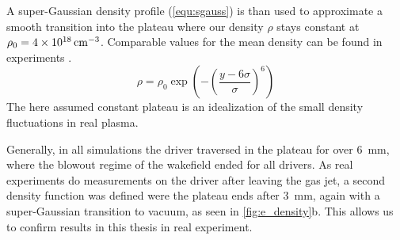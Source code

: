 \documentclass[bachelor_thesis]{subfiles}
\begin{document}
A super-Gaussian density profile (\autoref{equ:sgauss}) is than used to approximate a smooth transition into the plateau where our density $\rho$ stays constant at $\rho_0 = \qty{4d18}{\cm^{-3}}$. Comparable values for the mean density can be found in experiments \cite{Schoebel2022, Kurz2021}.
\begin{equation}
	\rho = \rho_0 \exp\left(-\left(\frac{y-6\sigma}{\sigma}\right)^6\right)
	\label{equ:sgauss}
\end{equation}
The here assumed constant plateau is an idealization of the small density fluctuations in real plasma.

Generally, in all simulations the driver traversed in the plateau for over \qty{6}{\mm}, where the blowout regime of the wakefield ended for all drivers. As real experiments do measurements on the driver after leaving the gas jet,
a second density function was defined were the plateau ends after \qty{3}{\mm}, again with a super-Gaussian transition to vacuum, as seen in \autoref{fig:e_density}b.
This allows us to confirm results in this thesis in real experiment.
\end{document}
